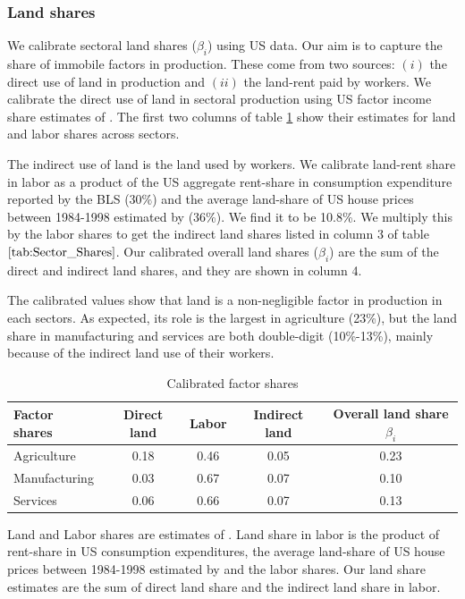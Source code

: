 \documentclass[12pt]{article}
\begin{document}
\subsubsection{Land shares}
We calibrate sectoral land shares ($\beta_i$) using US data. Our aim is to capture the share of immobile factors in production. These come from two sources: $(i)$ the direct use of land in production and $(ii)$ the land-rent paid by workers. We calibrate the direct use of land in sectoral production using US factor income share estimates of . The first two columns of table \ref{tab:Sector_Shares} show their estimates for land and labor shares across sectors.

The indirect use of land is the land used by workers. We calibrate land-rent share in labor as a product of the US aggregate rent-share in consumption expenditure reported by the BLS ($30\%$) and the average land-share of US house prices between 1984-1998 estimated by  (36\%). We find it to be 10.8\%. We multiply this by the labor shares to get the indirect land shares listed in column 3 of table $\ref{tab:Sector_Shares}$. Our calibrated overall land shares ($\beta_i$) are the sum of the direct and indirect land shares, and they are shown in column 4.

The calibrated values show that land is a non-negligible factor in production in each sectors. As expected, its role is the largest in agriculture (23\%), but the land share in manufacturing and services are both double-digit (10\%-13\%), mainly because of the indirect land use of their workers.


\begin{table}[h!]
\label{tab:Sector_Shares}
\caption{Calibrated factor shares}
\begin{center}
\begin{tabular}{l|ccc|c}
\toprule
Factor shares & Direct land & Labor & Indirect land & Overall land share $\beta_i$ \\
\midrule
Agriculture & 0.18 & 0.46  & 0.05 & 0.23 \\
Manufacturing& 0.03 & 0.67 & 0.07 & 0.10  \\
Services    &  0.06 & 0.66 & 0.07 & 0.13 \\
\bottomrule
\end{tabular}
\end{center}

\noindent \footnotesize{Land and Labor shares are estimates of . Land share in labor is the product of rent-share in US consumption expenditures, the average land-share of US house prices between 1984-1998 estimated by  and the labor shares. Our land share estimates are the sum of direct land share and the indirect land share in labor.}
\end{table}
\end{document}
